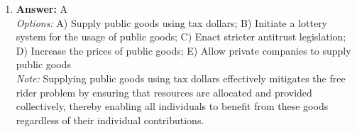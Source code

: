 \documentclass[12pt]{article}
\begin{document}
\begin{enumerate}[label=\arabic*.]
\\ \textit{Note:} Lower interest rates in the United States typically lead to a weaker dollar, which can make U.S. exports relatively cheaper for foreign buyers, while the actual value of the dollar may remain unchanged in terms of purchasing power, thus resulting in increased demand for exports without a change in their nominal value.
\item \textbf{Answer:} A
\\ \textit{Options:} A) Supply public goods using tax dollars; B) Initiate a lottery system for the usage of public goods; C) Enact stricter antitrust legislation; D) Increase the prices of public goods; E) Allow private companies to supply public goods
\\ \textit{Note:} Supplying public goods using tax dollars effectively mitigates the free rider problem by ensuring that resources are allocated and provided collectively, thereby enabling all individuals to benefit from these goods regardless of their individual contributions.
\end{enumerate}
\end{document}
